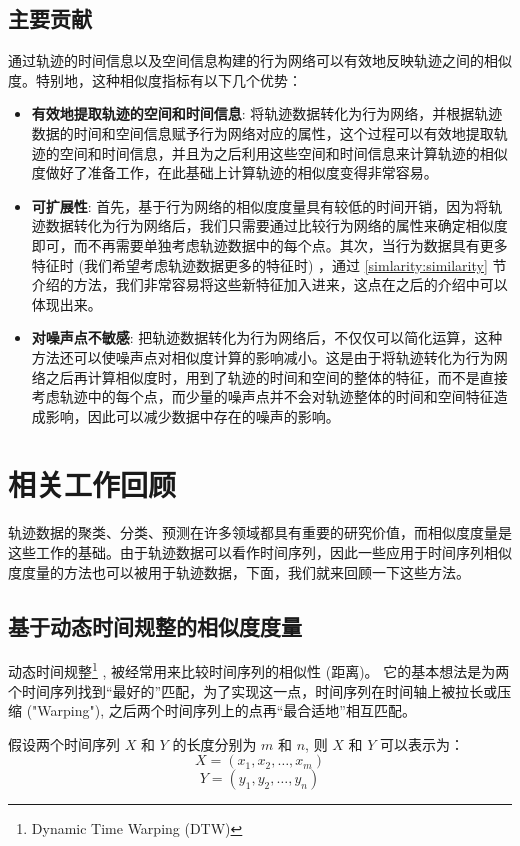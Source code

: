 \subsection{主要贡献}
通过轨迹的时间信息以及空间信息构建的行为网络可以有效地反映轨迹之间的相似度。特别地，这种相似度指标有以下几个优势：
\begin{itemize}
\item \textbf{有效地提取轨迹的空间和时间信息}: 将轨迹数据转化为行为网络，并根据轨迹数据的时间和空间信息赋予行为网络对应的属性，这个过程可以有效地提取轨迹的空间和时间信息，并且为之后利用这些空间和时间信息来计算轨迹的相似度做好了准备工作，在此基础上计算轨迹的相似度变得非常容易。
\item \textbf{可扩展性}: 首先，基于行为网络的相似度度量具有较低的时间开销，因为将轨迹数据转化为行为网络后，我们只需要通过比较行为网络的属性来确定相似度即可，而不再需要单独考虑轨迹数据中的每个点。其次，当行为数据具有更多特征时 (我们希望考虑轨迹数据更多的特征时) ，通过 \ref{simlarity:similarity} 节介绍的方法，我们非常容易将这些新特征加入进来，这点在之后的介绍中可以体现出来。
\item \textbf{对噪声点不敏感}: 把轨迹数据转化为行为网络后，不仅仅可以简化运算，这种方法还可以使噪声点对相似度计算的影响减小。这是由于将轨迹转化为行为网络之后再计算相似度时，用到了轨迹的时间和空间的整体的特征，而不是直接考虑轨迹中的每个点，而少量的噪声点并不会对轨迹整体的时间和空间特征造成影响，因此可以减少数据中存在的噪声的影响。
\end{itemize}

\section{相关工作回顾}
\label{simlarity:relatedwork}
轨迹数据的聚类、分类、预测在许多领域都具有重要的研究价值，而相似度度量是这些工作的基础。由于轨迹数据可以看作时间序列，因此一些应用于时间序列相似度度量的方法也可以被用于轨迹数据，下面，我们就来回顾一下这些方法。\par
\subsection{基于动态时间规整的相似度度量}
动态时间规整\footnote{Dynamic Time Warping (DTW)} , 被经常用来比较时间序列的相似性 (距离)。 它的基本想法是为两个时间序列找到``最好的''匹配，为了实现这一点，时间序列在时间轴上被拉长或压缩 ("Warping"), 之后两个时间序列上的点再``最合适地''相互匹配。\par
假设两个时间序列 $X$ 和 $Y$ 的长度分别为 $m$ 和 $n$, 则 $X$ 和 $Y$ 可以表示为：
\begin{equation}
\label{DTW1}
X = (x_1, x_2, \ldots, x_m)
\end{equation}
\begin{equation}
\label{DTW2}
Y = (y_1, y_2, \ldots, y_n)
\end{equation}

